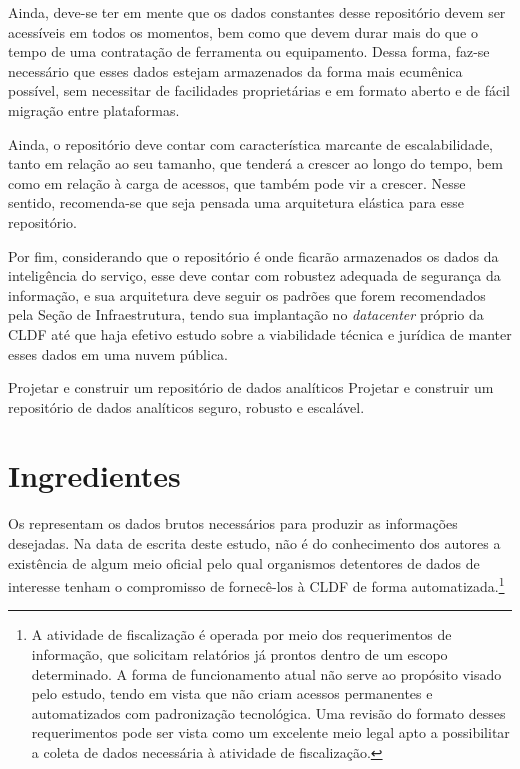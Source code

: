     Ainda, deve-se ter em mente que os dados constantes desse repositório devem ser acessíveis em todos os momentos, bem como que devem durar mais do que o tempo de uma contratação de ferramenta ou equipamento. Dessa forma, faz-se necessário que esses dados estejam armazenados da forma mais ecumênica possível, sem necessitar de facilidades proprietárias e em formato aberto e de fácil migração entre plataformas.
    
    Ainda, o repositório deve contar com característica marcante de escalabilidade, tanto em relação ao seu tamanho, que tenderá a crescer ao longo do tempo, bem como em relação à carga de acessos, que também pode vir a crescer. Nesse sentido, recomenda-se que seja pensada uma arquitetura elástica para esse repositório.
    
    Por fim, considerando que o repositório é onde ficarão armazenados os dados da inteligência do serviço, esse deve contar com robustez adequada de segurança da informação, e sua arquitetura deve seguir os padrões que forem recomendados pela Seção de Infraestrutura, tendo sua implantação no \emph{datacenter} próprio da CLDF até que haja efetivo estudo sobre a viabilidade técnica e jurídica de manter esses dados em uma nuvem pública.
    
    \begin{env-proposta}{Projetar e construir um repositório de dados analíticos}
        \nohyphens{Projetar e construir um repositório de dados analíticos seguro, robusto e escalável.}
    \end{env-proposta}    
    
    
    
    \section{Ingredientes}
    
    \begin{env-cenario2}{}
            \mschecknao \xspace \INGREDIENTES
    \end{env-cenario2}    
    
    Os  representam os dados brutos necessários para produzir as informações desejadas. Na data de escrita deste estudo, não é do conhecimento dos autores a existência de algum meio oficial pelo qual organismos detentores de dados de interesse tenham o compromisso de fornecê-los à CLDF de forma automatizada.\footnote{A atividade de fiscalização é operada por meio dos requerimentos de informação, que solicitam relatórios já prontos dentro de um escopo determinado. A forma de funcionamento atual não serve ao propósito visado pelo estudo, tendo em vista que não criam acessos permanentes e automatizados com padronização tecnológica. Uma revisão do formato desses requerimentos pode ser vista como um excelente meio legal apto a possibilitar a coleta de dados necessária à atividade de fiscalização.}
    
